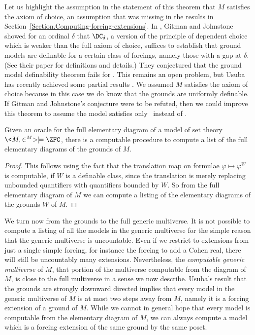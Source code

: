 \documentclass{amsart}
\begin{document}
Let us highlight the assumption in the statement of this theorem that $M$ satisfies the axiom of choice, an assumption that was missing in the results in Section~\ref{Section.Computing-forcing-extensions}. In \cite{gitmanjohnstone:groundmodels}, Gitman and Johnstone showed for an ordinal $\delta$ that $\DC_\delta$, a version of the principle of dependent choice which is weaker than the full axiom of choice, suffices to establish that ground models are definable for a certain class of forcings, namely those with a gap at $\delta$. (See their paper for definitions and details.) They conjectured that the ground model definability theorem fails for \ZF. This remains an open problem, but Usuba has recently achieved some partial results \cite{usuba2019}. We assumed $M$ satisfies the axiom of choice because in this case we do know that the grounds are uniformly definable. If Gitman and Johnstone's conjecture were to be refuted, then we could improve this theorem to assume the model satisfies only \ZF\ instead of \ZFC.
\begin{corollary}\label{Corollary.Computing-grounds}
Given an oracle for the full elementary diagram of a model of set theory $\<M,\in^M> \models \ZFC$, there is a computable procedure to compute a list of the full elementary diagrams of the grounds of $M$.
\end{corollary}
\begin{proof}
This follows using the fact that the translation map on formulae $\varphi \mapsto \varphi^W$ is computable, if $W$ is a definable class, since the translation is merely replacing unbounded quantifiers with quantifiers bounded by $W$. So from the full elementary diagram of $M$ we can compute a listing of the elementary diagrams of the grounds $W$ of $M$.
\end{proof}
We turn now from the grounds to the full generic multiverse. It is not possible to compute a listing of all the models in the generic multiverse for the simple reason that the generic multiverse is uncountable. Even if we restrict to extensions from just a single simple forcing, for instance the forcing to add a Cohen real, there will still be uncountably many extensions. Nevertheless, the \emph{computable generic multiverse} of $M$, that portion of the multiverse computable from the diagram of $M$, is close to the full multiverse in a sense we now describe.
Usuba's result that the grounds are strongly downward directed \cite{usuba2017} implies
that every model in the generic multiverse of $M$ is at most two steps away from $M$, namely it is a forcing extension of a ground of $M$. While we cannot in general hope that every model is computable from the elementary diagram of $M$, we can always compute a model which is a forcing extension of the same ground by the same poset.
\end{document}
